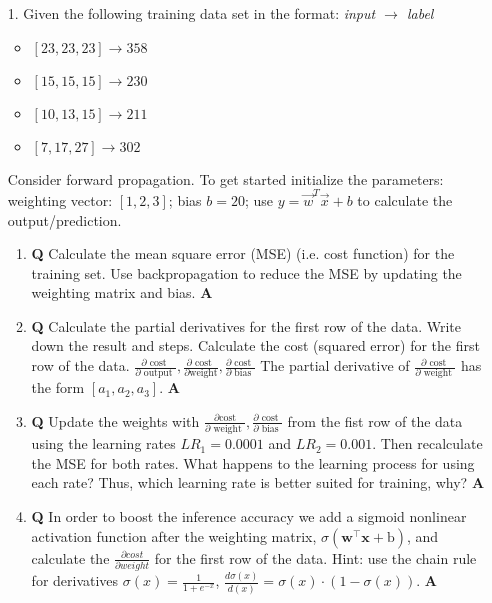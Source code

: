 \documentclass[main.tex]{subfiles}
\begin{document}
\begin{enumerate}

\item[1.] Given the following training data set in the format: \textit{input $\rightarrow$ label}
    \begin{itemize}[label={}]
        \item $[23,23,23] \rightarrow 358$
        \item $[15,15,15] \rightarrow 230$
        \item $[10,13,15] \rightarrow 211$
        \item $[7,17,27] \rightarrow 302$
    \end{itemize}
Consider forward propagation. To get started initialize the parameters: weighting vector: $[1,2,3]$; bias $b=20$; use $y=\vec{w}^{T}\vec{x}+b$ to calculate the output/prediction.
    \begin{enumerate}
        \item \textbf{Q} Calculate the mean square error (MSE) (i.e. cost function) for the training set. Use backpropagation to reduce the MSE by updating the weighting matrix and bias. \textbf{A}
        
        \item \textbf{Q} Calculate the partial derivatives for the first row of the data. Write down the result and steps. Calculate the cost (squared error) for the first row of the data. $\frac{\partial \text { cost }}{\partial \text { output }}, \frac{\partial \text { cost }}{\partial \text{weight}}, \frac{\partial \text { cost }}{\partial \text { bias }}$ The partial derivative of $\frac{\partial \text { cost }}{\partial \text { weight }}$ has the form $[a_1,a_2,a_3]$. \textbf{A}
       
        \item \textbf{Q} Update the weights with $\frac{\partial \text{cost}}{\partial \text { weight }}, \frac{\partial \text { cost }}{\partial \text { bias }}$ from the fist row of the data using the learning rates $LR_1 = 0.0001$ and $LR_2 = 0.001$. Then recalculate the MSE for both rates. What happens to the learning process for using each rate? Thus, which learning rate is better suited for training, why? \textbf{A}
        
        \item \textbf{Q} In order to boost the inference accuracy we add a sigmoid nonlinear activation function after the weighting matrix, $\sigma\left(\boldsymbol{w}^{\top} \boldsymbol{x}+\mathrm{b}\right)$, and calculate the $\frac{\partial cost}{\partial weight}$ for the first row of the data. Hint: use the chain rule for derivatives $\sigma(x)=\frac{1}{1+e^{-x}}$, $\frac{d \sigma(x)}{d(x)}=\sigma(x) \cdot(1-\sigma(x))$. \textbf{A}
        

\end{enumerate}
\end{enumerate}
\end{document}
